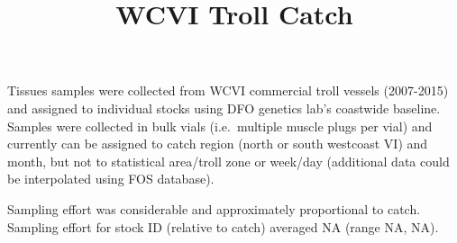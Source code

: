 \documentclass[]{article}
\title{WCVI Troll Catch}
\author{}
\date{}
\newenvironment{Shaded}{\begin{snugshade}}{\end{snugshade}}
\newcommand{\DataTypeTok}[1]{\textcolor[rgb]{0.13,0.29,0.53}{#1}}
\newcommand{\KeywordTok}[1]{\textcolor[rgb]{0.13,0.29,0.53}{\textbf{#1}}}
\newcommand{\NormalTok}[1]{#1}
\newcommand{\OperatorTok}[1]{\textcolor[rgb]{0.81,0.36,0.00}{\textbf{#1}}}
\newcommand{\StringTok}[1]{\textcolor[rgb]{0.31,0.60,0.02}{#1}}
\begin{document}
\maketitle

Tissues samples were collected from WCVI commercial troll vessels
(2007-2015) and assigned to individual stocks using DFO genetics lab's
coastwide baseline. Samples were collected in bulk vials (i.e.~multiple
muscle plugs per vial) and currently can be assigned to catch region
(north or south westcoast VI) and month, but not to statistical
area/troll zone or week/day (additional data could be interpolated using
FOS database).

Sampling effort was considerable and approximately proportional to
catch. Sampling effort for stock ID (relative to catch) averaged NA
(range NA, NA).

\begin{Shaded}
\end{Shaded}
\end{document}
